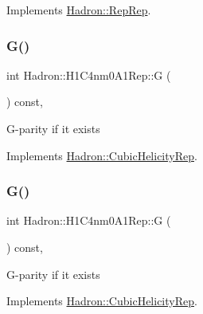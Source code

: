 Implements \mbox{\hyperlink{structHadron_1_1RepRep_a92c8802e5ed7afd7da43ccfd5b7cd92b}{Hadron\+::\+Rep\+Rep}}.

\mbox{\label{structHadron_1_1H1C4nm0A1Rep_ac3ccdfe680b252157327562d9f175c65}} 
\subsubsection{\texorpdfstring{G()}{G()}\hspace{0.1cm}{\footnotesize\ttfamily [1/3]}}
{\footnotesize\ttfamily int Hadron\+::\+H1\+C4nm0\+A1\+Rep\+::G (\begin{DoxyParamCaption}{ }\end{DoxyParamCaption}) const\hspace{0.3cm}{\ttfamily [inline]}, {\ttfamily [virtual]}}

G-\/parity if it exists 

Implements \mbox{\hyperlink{structHadron_1_1CubicHelicityRep_a50689f42be1e6170aa8cf6ad0597018b}{Hadron\+::\+Cubic\+Helicity\+Rep}}.

\mbox{\label{structHadron_1_1H1C4nm0A1Rep_ac3ccdfe680b252157327562d9f175c65}} 
\subsubsection{\texorpdfstring{G()}{G()}\hspace{0.1cm}{\footnotesize\ttfamily [2/3]}}
{\footnotesize\ttfamily int Hadron\+::\+H1\+C4nm0\+A1\+Rep\+::G (\begin{DoxyParamCaption}{ }\end{DoxyParamCaption}) const\hspace{0.3cm}{\ttfamily [inline]}, {\ttfamily [virtual]}}

G-\/parity if it exists 

Implements \mbox{\hyperlink{structHadron_1_1CubicHelicityRep_a50689f42be1e6170aa8cf6ad0597018b}{Hadron\+::\+Cubic\+Helicity\+Rep}}.

\mbox{\label{structHadron_1_1H1C4nm0A1Rep_ac3ccdfe680b252157327562d9f175c65}} 
